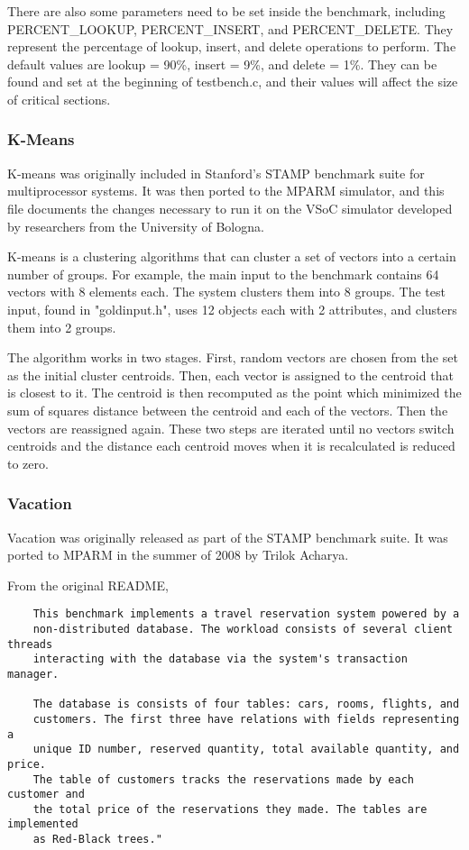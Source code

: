 \documentclass{article}
\begin{document}
There are also some parameters need to be set inside the benchmark, including 
 PERCENT\_LOOKUP, PERCENT\_INSERT, and PERCENT\_DELETE. They 
represent the percentage of lookup, insert, and delete operations to perform.
The default values are lookup = 90\%, insert = 9\%, and 
delete = 1\%. They can be found and set at the beginning of testbench.c,
and their values will affect the size of critical sections. 


\subsubsection{K-Means}

K-means was originally included in Stanford's STAMP benchmark suite for 
multiprocessor systems.  It was then ported to the MPARM simulator, and this
file documents the changes necessary to run it on the VSoC simulator developed
by researchers from the University of Bologna. 

K-means is a clustering algorithms that can cluster a set of vectors into a 
certain number of groups.  For example, the main input to the benchmark
contains 64 vectors with 8 elements each. The system clusters them into 8
groups.  The test input, found in "goldinput.h", uses 12 objects each with 
2 attributes, and clusters them into 2 groups. 

The algorithm works in two stages. First, random vectors are chosen from the
set as the initial cluster centroids. Then, each vector is assigned to the 
centroid that is closest to it. The centroid is then recomputed as the point
which minimized the sum of squares distance between the centroid and each of 
the vectors. Then the vectors are reassigned again. These two steps are
iterated until no vectors switch centroids and the distance each centroid moves
when it is recalculated is reduced to zero. 

\subsubsection{Vacation}

Vacation was originally released as part of the STAMP benchmark suite. It was
ported to MPARM in the summer of 2008 by Trilok Acharya.

From the original README, 

\begin{verbatim}
    This benchmark implements a travel reservation system powered by a
    non-distributed database. The workload consists of several client threads
    interacting with the database via the system's transaction manager.

    The database is consists of four tables: cars, rooms, flights, and 
    customers. The first three have relations with fields representing a 
    unique ID number, reserved quantity, total available quantity, and price. 
    The table of customers tracks the reservations made by each customer and 
    the total price of the reservations they made. The tables are implemented 
    as Red-Black trees."
\end{verbatim}
\end{document}
